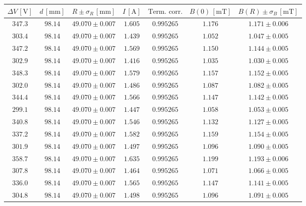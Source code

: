 \documentclass[]{article}
\begin{document}
\begin{table}[H]
    \centering

\begin{tabular}{||c|c|c|c|c|c|c||}
    \hline
    $\Delta V\, [\text{V}] $ & $d\, [\text{mm}] $ & $R \pm \sigma_R\, [\text{mm}] $ & $I\, [\text{A}] $ & $\text{Term. corr.}$ & $B(0)\, [\text{mT}] $ & $B(R) \pm \sigma_B\, [\text{mT}] $ \\
    \hline\hline

    $347.3$ & $98.14$ & $49.070 \pm 0.007$ & $1.605$ & $0.995265$ & $1.176$ & $1.171 \pm 0.006$ \\\hline
    $303.4$ & $98.14$ & $49.070 \pm 0.007$ & $1.439$ & $0.995265$ & $1.052$ & $1.047 \pm 0.005$ \\\hline
    $347.2$ & $98.14$ & $49.070 \pm 0.007$ & $1.569$ & $0.995265$ & $1.150$ & $1.144 \pm 0.005$ \\\hline
    $302.9$ & $98.14$ & $49.070 \pm 0.007$ & $1.416$ & $0.995265$ & $1.035$ & $1.030 \pm 0.005$ \\\hline
    $348.3$ & $98.14$ & $49.070 \pm 0.007$ & $1.579$ & $0.995265$ & $1.157$ & $1.152 \pm 0.005$ \\\hline
    $302.0$ & $98.14$ & $49.070 \pm 0.007$ & $1.486$ & $0.995265$ & $1.087$ & $1.082 \pm 0.005$ \\\hline
    $344.4$ & $98.14$ & $49.070 \pm 0.007$ & $1.566$ & $0.995265$ & $1.147$ & $1.142 \pm 0.005$ \\\hline
    $299.1$ & $98.14$ & $49.070 \pm 0.007$ & $1.447$ & $0.995265$ & $1.058$ & $1.053 \pm 0.005$ \\\hline
    $340.8$ & $98.14$ & $49.070 \pm 0.007$ & $1.546$ & $0.995265$ & $1.132$ & $1.127 \pm 0.005$ \\\hline
    $337.2$ & $98.14$ & $49.070 \pm 0.007$ & $1.582$ & $0.995265$ & $1.159$ & $1.154 \pm 0.005$ \\\hline
    $301.9$ & $98.14$ & $49.070 \pm 0.007$ & $1.497$ & $0.995265$ & $1.096$ & $1.090 \pm 0.005$ \\\hline
    $358.7$ & $98.14$ & $49.070 \pm 0.007$ & $1.635$ & $0.995265$ & $1.199$ & $1.193 \pm 0.006$ \\\hline
    $307.8$ & $98.14$ & $49.070 \pm 0.007$ & $1.464$ & $0.995265$ & $1.071$ & $1.066 \pm 0.005$ \\\hline
    $336.0$ & $98.14$ & $49.070 \pm 0.007$ & $1.565$ & $0.995265$ & $1.147$ & $1.141 \pm 0.005$ \\\hline
    $304.8$ & $98.14$ & $49.070 \pm 0.007$ & $1.498$ & $0.995265$ & $1.096$ & $1.091 \pm 0.005$ \\\hline

\end{tabular}
\end{table}
\end{document}
